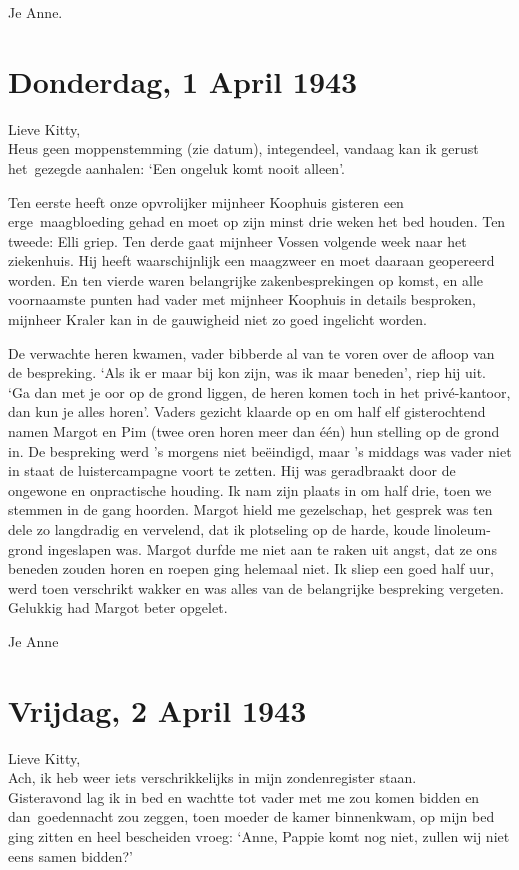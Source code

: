 \documentclass{book}
\begin{document}
Je Anne.

\section*{Donderdag, 1 April 1943}

Lieve Kitty,\\
Heus geen moppenstemming (zie datum), integendeel, vandaag kan ik
gerust het~gezegde aanhalen: `Een ongeluk komt nooit alleen'.

Ten eerste heeft onze opvrolijker mijnheer Koophuis gisteren een
erge~maagbloeding gehad en moet op zijn minst drie weken het bed houden.  Ten
tweede: Elli griep. Ten derde gaat mijnheer Vossen volgende week naar het
ziekenhuis. Hij heeft waarschijnlijk een maagzweer en moet daaraan geopereerd
worden. En ten vierde waren belangrijke zakenbesprekingen op komst, en alle
voornaamste punten had vader met mijnheer Koophuis in details besproken,
mijnheer Kraler kan in de gauwigheid niet zo goed ingelicht worden.

De verwachte heren kwamen, vader bibberde al van te voren over de afloop van de
bespreking. `Als ik er maar bij kon zijn, was ik maar beneden', riep hij uit.
`Ga dan met je oor op de grond liggen, de heren komen toch in het privé-kantoor,
dan kun je alles horen'. Vaders gezicht klaarde op en om half elf gisterochtend
namen Margot en Pim (twee oren horen meer dan één) hun stelling op de grond in.
De bespreking werd 's morgens niet beëindigd, maar 's middags was vader niet in
staat de luistercampagne voort te zetten. Hij was geradbraakt door de ongewone
en onpractische houding. Ik nam zijn plaats in om half drie, toen we stemmen in
de gang hoorden. Margot hield me gezelschap, het gesprek was ten dele zo
langdradig en vervelend, dat ik plotseling op de harde, koude linoleum-grond
ingeslapen was. Margot durfde me niet aan te raken uit angst, dat ze ons beneden
zouden horen en roepen ging helemaal niet. Ik sliep een goed half uur, werd toen
verschrikt wakker en was alles van de belangrijke bespreking vergeten. Gelukkig
had Margot beter opgelet.

Je Anne

\section*{Vrijdag, 2 April 1943}

Lieve Kitty,\\
Ach, ik heb weer iets verschrikkelijks in mijn zondenregister
staan.\\
Gisteravond lag ik in bed en wachtte tot vader met me zou komen bidden
en dan~goedennacht zou zeggen, toen moeder de kamer binnenkwam, op mijn bed ging
zitten en heel bescheiden vroeg: `Anne, Pappie komt nog niet, zullen wij niet
eens samen bidden?'
\end{document}
